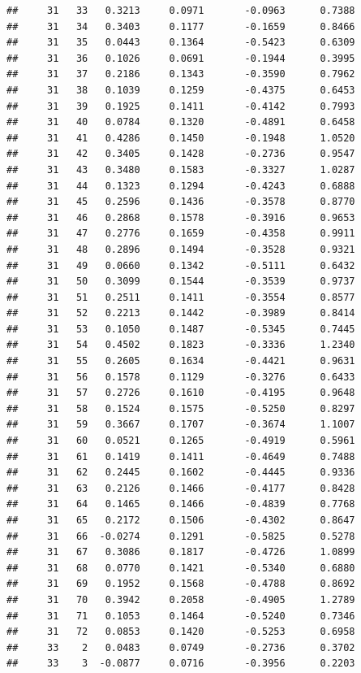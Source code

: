 \documentclass[
]{article}
\begin{document}
\begin{verbatim}
##     31   33   0.3213     0.0971       -0.0963      0.7388 
##     31   34   0.3403     0.1177       -0.1659      0.8466 
##     31   35   0.0443     0.1364       -0.5423      0.6309 
##     31   36   0.1026     0.0691       -0.1944      0.3995 
##     31   37   0.2186     0.1343       -0.3590      0.7962 
##     31   38   0.1039     0.1259       -0.4375      0.6453 
##     31   39   0.1925     0.1411       -0.4142      0.7993 
##     31   40   0.0784     0.1320       -0.4891      0.6458 
##     31   41   0.4286     0.1450       -0.1948      1.0520 
##     31   42   0.3405     0.1428       -0.2736      0.9547 
##     31   43   0.3480     0.1583       -0.3327      1.0287 
##     31   44   0.1323     0.1294       -0.4243      0.6888 
##     31   45   0.2596     0.1436       -0.3578      0.8770 
##     31   46   0.2868     0.1578       -0.3916      0.9653 
##     31   47   0.2776     0.1659       -0.4358      0.9911 
##     31   48   0.2896     0.1494       -0.3528      0.9321 
##     31   49   0.0660     0.1342       -0.5111      0.6432 
##     31   50   0.3099     0.1544       -0.3539      0.9737 
##     31   51   0.2511     0.1411       -0.3554      0.8577 
##     31   52   0.2213     0.1442       -0.3989      0.8414 
##     31   53   0.1050     0.1487       -0.5345      0.7445 
##     31   54   0.4502     0.1823       -0.3336      1.2340 
##     31   55   0.2605     0.1634       -0.4421      0.9631 
##     31   56   0.1578     0.1129       -0.3276      0.6433 
##     31   57   0.2726     0.1610       -0.4195      0.9648 
##     31   58   0.1524     0.1575       -0.5250      0.8297 
##     31   59   0.3667     0.1707       -0.3674      1.1007 
##     31   60   0.0521     0.1265       -0.4919      0.5961 
##     31   61   0.1419     0.1411       -0.4649      0.7488 
##     31   62   0.2445     0.1602       -0.4445      0.9336 
##     31   63   0.2126     0.1466       -0.4177      0.8428 
##     31   64   0.1465     0.1466       -0.4839      0.7768 
##     31   65   0.2172     0.1506       -0.4302      0.8647 
##     31   66  -0.0274     0.1291       -0.5825      0.5278 
##     31   67   0.3086     0.1817       -0.4726      1.0899 
##     31   68   0.0770     0.1421       -0.5340      0.6880 
##     31   69   0.1952     0.1568       -0.4788      0.8692 
##     31   70   0.3942     0.2058       -0.4905      1.2789 
##     31   71   0.1053     0.1464       -0.5240      0.7346 
##     31   72   0.0853     0.1420       -0.5253      0.6958 
##     33    2   0.0483     0.0749       -0.2736      0.3702 
##     33    3  -0.0877     0.0716       -0.3956      0.2203 

\end{verbatim}
\end{document}
